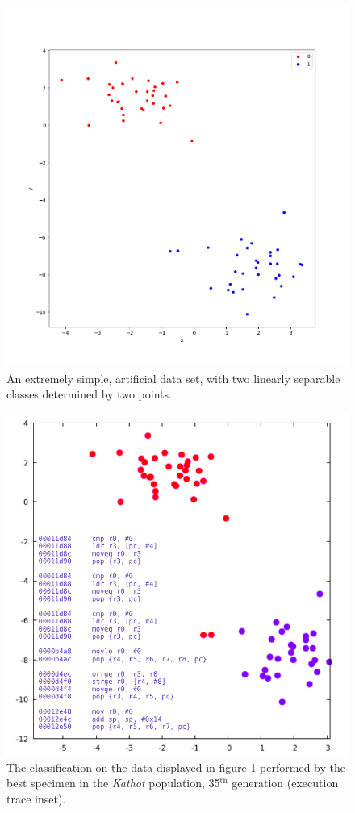 \documentclass[12pt,glossary]{dalthesis}
\begin{document}
\begin{figure}[htbp]
\centering
\includegraphics[width=.9\linewidth]{../images/plots/2_simple_blobs.png}
\caption{\label{fig:org9efe759}
An extremely simple, artificial data set, with two linearly separable classes determined by two points.}
\end{figure}

\begin{figure}[htbp]
\centering
\includegraphics[width=.9\linewidth]{../images/plots/kathot_champion_18916_blobs_disas.pdf}
\caption{\label{fig:orgd3be011}
The classification on the data displayed in figure \ref{fig:org9efe759} performed by the best specimen in the \emph{Kathot} population, 35\(^{\text{th}}\) generation (execution trace inset).}
\end{figure}
\end{document}
